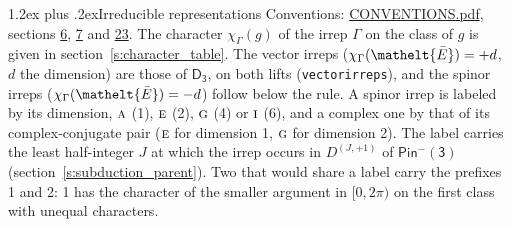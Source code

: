 \documentclass[10pt,a4paper]{article}
\makeatletter
\renewcommand\section{\@startsection{section}{1}{\z@}{-3ex plus -1ex minus -.2ex}%
  {1.2ex plus .2ex}{\normalfont\large\sffamily\bfseries\color{parttitle}}}
\numberwithin{equation}{section}
\newcommand{\eltfont}[1]{{\let\sigma\eltsigma\mathelt{#1}}}
\newcommand{\grp}[1]{\mathsf{#1}}
\newcommand{\irr}[1]{\text{\normalfont\scshape #1}}
\newcommand{\elt}[1]{\eltfont{#1}}
\newcommand{\irrJp}[2]{D^{(#1,#2)}}
\newcommand{\irchar}[1]{\chi_{#1}}
\newcommand{\barred}[1]{\bar{#1}}
\makeatother
\begin{document}
\section{Irreducible representations}\label{s:irreps}
Conventions: \href{../../CONVENTIONS.pdf}{CONVENTIONS.pdf}, sections \href{../../../rotation/CONVENTIONS.pdf\#conv.6}{6}, \href{../../../rotation/CONVENTIONS.pdf\#conv.7}{7} and \href{../../CONVENTIONS.pdf\#conv.23}{23}.
\leavevmode\label{n:function.character}\label{n:irrep.Gamma}The character $\irchar{\Gamma}(g)$ of the irrep $\Gamma$ on the class of $g$ is given in section~\ref{s:character_table}. \label{n:index.dimension}The vector irreps ($\irchar{\Gamma}(\elt{\barred{E}}) = +d$, $d$ the dimension) are those of \href{../../../rotation/data/pdf/D3.pdf}{$\grp{D_{3}}$}, on both lifts (\texttt{vectorirreps}), and the spinor irreps ($\irchar{\Gamma}(\elt{\barred{E}}) = -d$) follow below the rule. A spinor irrep is labeled by its dimension, $\irr{a}$ (1), $\irr{e}$ (2), $\irr{g}$ (4) or $\irr{i}$ (6), and a complex one by that of its complex-conjugate pair ($\irr{e}$ for dimension 1, $\irr{g}$ for dimension 2). The label carries the least half-integer $J$ at which the irrep occurs in $\irrJp{J}{+1}$ of $\grp{Pin^{-}(3)}$ (section~\ref{s:subduction_parent}). Two that would share a label carry the prefixes 1 and 2: 1 has the character of the smaller argument in $[0, 2\pi)$ on the first class with unequal characters.
\end{document}
